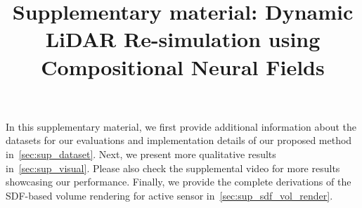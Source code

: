 \documentclass[10pt,twocolumn,letterpaper]{article}
\title{Supplementary material: Dynamic LiDAR Re-simulation using Compositional Neural Fields}
\begin{document}
\maketitle




In this supplementary material, we first provide additional information about the datasets for our evaluations and implementation details of our proposed method in~\cref{sec:sup_dataset}. Next, we present more qualitative results in~\cref{sec:sup_visual}. Please also check the supplemental video for more results showcasing our performance. Finally, we provide the complete derivations of the SDF-based volume rendering for active sensor in~\cref{sec:sup_sdf_vol_render}. 




% 

{\small


}
\end{document}

